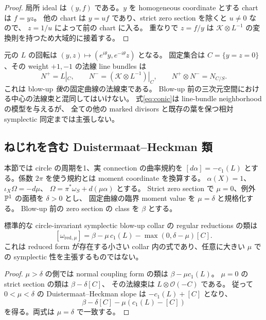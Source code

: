 \begin{proof}
局所 ideal は $(y,f)$ である。$y$ を homogeneous coordinate とする chart は $f=yz$。
他の chart は $y=uf$ であり、strict zero section を除くと $u\ne0$ なので、
$z=1/u$ によって前の chart に入る。
重なりで $z=f/y$ は $\mathcal K\otimes L^{-1}$ の変換則を持つため大域的に接着する。
\end{proof}

元の $L$ の回転は $(y,z)\mapsto(e^{i\theta}y,e^{-i\theta}z)$ となる。
固定集合は $C=\{y=z=0\}$、その weight $+1,-1$ の法線 line bundles は
\begin{equation}\label{eq:weight-lines}
N^+=L|_C,\qquad N^-=(\mathcal K\otimes L^{-1})|_C,\qquad
N^+\otimes N^-=N_{C/S}.
\end{equation}
これは blow-up \emph{後}の固定曲線の法線束である。
Blow-up 前の三次元空間における中心の法線束と混同してはいけない。
式\eqref{eq:conic}は line-bundle neighborhood の模型を与えるが、
全ての他の marked divisors と既存の葉を保つ相対 symplectic 同定までは主張しない。

\subsection{ねじれを含む Duistermaat--Heckman 類}

本節では circle の周期を1、実 connection の曲率規約を
$[d\alpha]=-c_1(L)$ とする。係数 $2\pi$ を使う規約とは moment coordinate を換算する。
$\alpha(X)=1$、$\iota_X\Omega=-d\mu$、
$\Omega=\pi^*\omega_S+d(\mu\alpha)$ とする。
Strict zero section で $\mu=0$、例外 $\mathbb P^1$ の面積を $\delta>0$ とし、
固定曲線の臨界 moment value を $\mu=\delta$ と規格化する。
Blow-up 前の zero section の class を $\beta$ とする。

\begin{proposition}\label{prop:dh}
標準的な circle-invariant symplectic blow-up collar の regular reductions の類は
\begin{equation}\label{eq:twisted-dh}
[\omega_{\mathrm{red},\mu}]
=\beta-\mu\,c_1(L)-\max(0,\delta-\mu)[C].
\end{equation}
これは reduced form が存在する小さい collar 内の式であり、任意に大きい $\mu$ での
symplectic 性を主張するものではない。
\end{proposition}

\begin{proof}
$\mu>\delta$ の側では normal coupling form の類は $\beta-\mu c_1(L)$。
$\mu=0$ の strict section の類は $\beta-\delta[C]$、
その法線束は $L\otimes\mathcal O(-C)$ である。
従って $0<\mu<\delta$ の Duistermaat--Heckman slope は $-c_1(L)+[C]$ となり、
\[
\beta-\delta[C]-\mu(c_1(L)-[C])
\]
を得る。両式は $\mu=\delta$ で一致する。
\end{proof}

